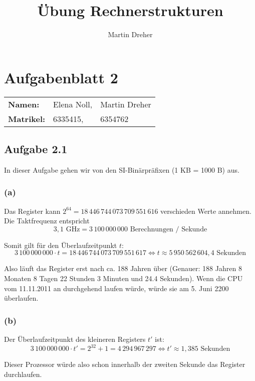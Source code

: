 \documentclass[12pt,a4paper]{article}
\author{Martin Dreher}
\title{Übung Rechnerstrukturen}
\begin{document}
 
 \section*{Aufgabenblatt 2}
 
 \begin{tabular}{l l l}
 \textbf{Namen: } & Elena Noll, & Martin Dreher \\
 \textbf{Matrikel: } & 6335415, & 6354762
 \end{tabular}
 
 \subsection*{Aufgabe 2.1}
 In dieser Aufgabe gehen wir von den SI-Binärpräfixen (1 KB = 1000 B) aus.
 
 \subsubsection*{(a)}
 Das Register kann $2^{64} = 18\,446\,744\,073\,709\,551\,616$ verschieden Werte annehmen. Die Taktfrequenz entspricht
 $$3,1 \textrm{ GHz} = 3\,100\,000\,000 \textrm{ Berechnungen / Sekunde}$$
 
 Somit gilt für den Überlaufzeitpunkt $t$:
 $$3\,100\,000\,000 \cdot t = 18\,446\,744\,073\,709\,551\,617 \Leftrightarrow t \approx 5\,950\,562\,604,4 \textrm{ Sekunden}$$
 
 Also läuft das Register erst nach ca. 188 Jahren über (Genauer: 188 Jahren 8 Monaten 8 Tagen 22 Stunden 3 Minuten und 24.4 Sekunden). Wenn die CPU vom 11.11.2011 an durchgehend laufen würde, würde sie am 5. Juni 2200 überlaufen.
 
 \subsubsection*{(b)}
 
 Der Überlaufzeitpunkt des kleineren Registers $t'$ ist:
 $$3\,100\,000\,000 \cdot t' = 2^{32}+1 = 4\,294\,967\,297 \Leftrightarrow t' \approx 1,385 \textrm{ Sekunden}$$
 
 Dieser Prozessor würde also schon innerhalb der zweiten Sekunde das Register durchlaufen.
 
 
\end{document}
